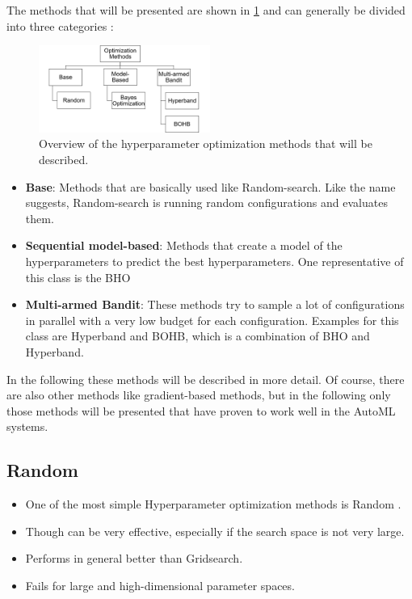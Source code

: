 The methods that will be presented are shown in \cref{fig:hpo} and can generally be divided into three categories \cite{Li2017Hyperband:Optimization,BergstraAlgorithmsOptimization, Falkner2018BOHB:Scale, Feurer2015EfficientLearning}:
\begin{figure}
    \centering
    \includegraphics[width=0.5\textwidth]{data/HPO_methods.png}
    \caption{Overview of the hyperparameter optimization methods that will be described.}
    \label{fig:hpo}
\end{figure}
\begin{itemize}
    \item \textbf{Base}: Methods that are basically used like Random-search.
    Like the name suggests, Random-search is running random configurations and evaluates them.
    \item \textbf{Sequential model-based}: Methods that create a model of the hyperparameters to predict the best hyperparameters.
    One representative of this class is the \gls{BHO}
    \item \textbf{Multi-armed Bandit}: These methods try to sample a lot of configurations in parallel with a very low budget for each configuration.
    Examples for this class are Hyperband and \gls{BOHB}, which is a combination of \gls{BHO} and Hyperband.
\end{itemize}

In the following these methods will be described in more detail.
Of course, there are also other methods like gradient-based methods, but in the following only those methods will be presented that have proven to work well in the AutoML systems.


\subsection{Random}

\begin{itemize}
    \item One of the most simple Hyperparameter optimization methods is Random \cite{Bergstra:2012:RSH:2503308.2188395}.
    \item Though can be very effective, especially if the search space is not very large.
    \item Performs in general better than Gridsearch.
    \item Fails for large and high-dimensional parameter spaces.
    
\end{itemize}

